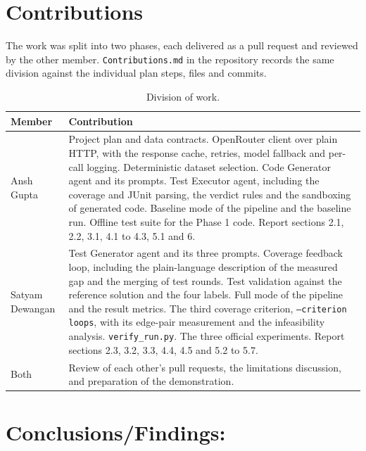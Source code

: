 \documentclass[11pt,a4paper]{article}
\begin{document}
\newpage

\section{Contributions}

The work was split into two phases, each delivered as a pull request and reviewed by the other member.
\texttt{Contributions.md} in the repository records the same division against the individual plan steps, files
and commits.

\begin{table}[htbp]
\centering
\small
\caption{Division of work.}
\label{tab:contrib}
\begin{tabular}{@{}p{3.2cm}p{10.8cm}@{}}
\toprule
\textbf{Member} & \textbf{Contribution} \\
\midrule
Ansh Gupta & Project plan and data contracts. OpenRouter client over plain HTTP, with the response cache,
retries, model fallback and per-call logging. Deterministic dataset selection. Code Generator agent and its
prompts. Test Executor agent, including the coverage and JUnit parsing, the verdict rules and the sandboxing of
generated code. Baseline mode of the pipeline and the baseline run. Offline test suite for the Phase 1 code.
Report sections 2.1, 2.2, 3.1, 4.1 to 4.3, 5.1 and 6. \\
\addlinespace
Satyam Dewangan & Test Generator agent and its three prompts. Coverage feedback loop, including the
plain-language description of the measured gap and the merging of test rounds. Test validation against the
reference solution and the four labels. Full mode of the pipeline and the result metrics. The third coverage
criterion, \texttt{--criterion loops}, with its edge-pair measurement and the infeasibility analysis.
\texttt{verify\_run.py}. The three official experiments. Report sections 2.3, 3.2, 3.3, 4.4, 4.5 and 5.2 to
5.7. \\
\addlinespace
Both & Review of each other's pull requests, the limitations discussion, and preparation of the demonstration.
\\
\bottomrule
\end{tabular}
\end{table}

\newpage

\section{Conclusions/Findings:}
\end{document}
